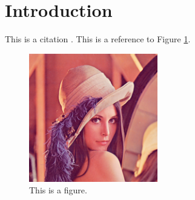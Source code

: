\section{Introduction}

This is a citation \cite{ref:citation}. This is a reference to Figure \ref{fig:var}.\n
{}

\begin{figure}[!ht] \centering
\includegraphics[width=0.5\textwidth]{fig/lena.png}
\caption{This is a figure.}
\label{fig:var}
\end{figure}